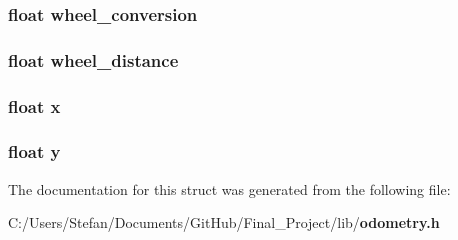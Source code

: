 \subsubsection[{wheel\-\_\-conversion}]{\setlength{\rightskip}{0pt plus 5cm}float wheel\-\_\-conversion}\label{structodometry_track_struct_a7f57aa52f69f42207b64b0a6e5155ba0}
\subsubsection[{wheel\-\_\-distance}]{\setlength{\rightskip}{0pt plus 5cm}float wheel\-\_\-distance}\label{structodometry_track_struct_a595a89c66991ab115a4bcbfbe810726d}
\subsubsection[{x}]{\setlength{\rightskip}{0pt plus 5cm}float x}\label{structodometry_track_struct_ad0da36b2558901e21e7a30f6c227a45e}
\subsubsection[{y}]{\setlength{\rightskip}{0pt plus 5cm}float y}\label{structodometry_track_struct_aa4f0d3eebc3c443f9be81bf48561a217}


The documentation for this struct was generated from the following file\-:\begin{DoxyCompactItemize}
\item 
C\-:/\-Users/\-Stefan/\-Documents/\-Git\-Hub/\-Final\-\_\-\-Project/lib/{\bf odometry.\-h}\end{DoxyCompactItemize}
